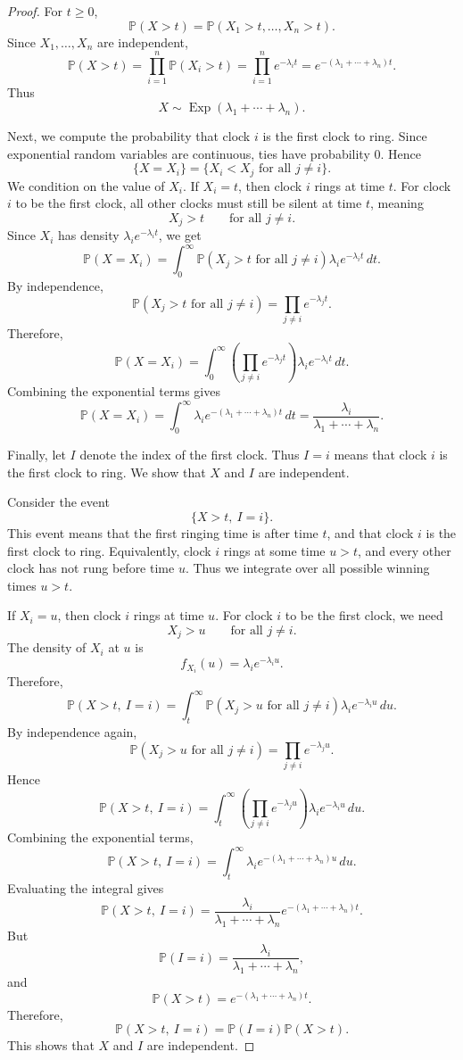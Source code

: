 \documentclass[11pt]{article}
\theoremstyle{plain}
\theoremstyle{definition}
\theoremstyle{remark}
\begin{document}
\begin{proof}
	For \(t\ge 0\),
	\[
	\mathbb{P}(X>t)
	=
	\mathbb{P}(X_1>t,\dots,X_n>t).
	\]
	Since \(X_1,\dots,X_n\) are independent,
	\[
	\mathbb{P}(X>t)
	=
	\prod_{i=1}^{n}\mathbb{P}(X_i>t)
	=
	\prod_{i=1}^{n}e^{-\lambda_i t}
	=
	e^{-(\lambda_1+\cdots+\lambda_n)t}.
	\]
	Thus
	\[
	X\sim\operatorname{Exp}(\lambda_1+\cdots+\lambda_n).
	\]
	
	Next, we compute the probability that clock \(i\) is the first clock to ring. Since exponential random variables are continuous, ties have probability \(0\). Hence
	\[
	\{X=X_i\}
	=
	\{X_i<X_j\text{ for all }j\neq i\}.
	\]
	We condition on the value of \(X_i\). If \(X_i=t\), then clock \(i\) rings at time \(t\). For clock \(i\) to be the first clock, all other clocks must still be silent at time \(t\), meaning
	\[
	X_j>t
	\qquad
	\text{for all }j\neq i.
	\]
	Since \(X_i\) has density \(\lambda_i e^{-\lambda_i t}\), we get
	\[
	\mathbb{P}(X=X_i)
	=
	\int_0^\infty
	\mathbb{P}(X_j>t\text{ for all }j\neq i)\lambda_i e^{-\lambda_i t}\,dt.
	\]
	By independence,
	\[
	\mathbb{P}(X_j>t\text{ for all }j\neq i)
	=
	\prod_{j\neq i}e^{-\lambda_j t}.
	\]
	Therefore,
	\[
	\mathbb{P}(X=X_i)
	=
	\int_0^\infty
	\left(\prod_{j\neq i}e^{-\lambda_j t}\right)
	\lambda_i e^{-\lambda_i t}\,dt.
	\]
	Combining the exponential terms gives
	\[
	\mathbb{P}(X=X_i)
	=
	\int_0^\infty
	\lambda_i e^{-(\lambda_1+\cdots+\lambda_n)t}\,dt
	=
	\frac{\lambda_i}{\lambda_1+\cdots+\lambda_n}.
	\]
	
	Finally, let \(I\) denote the index of the first clock. Thus \(I=i\) means that clock \(i\) is the first clock to ring. We show that \(X\) and \(I\) are independent.
	
	Consider the event
	\[
	\{X>t,\ I=i\}.
	\]
	This event means that the first ringing time is after time \(t\), and that clock \(i\) is the first clock to ring. Equivalently, clock \(i\) rings at some time \(u>t\), and every other clock has not rung before time \(u\). Thus we integrate over all possible winning times \(u>t\).
	
	If \(X_i=u\), then clock \(i\) rings at time \(u\). For clock \(i\) to be the first clock, we need
	\[
	X_j>u
	\qquad
	\text{for all }j\neq i.
	\]
	The density of \(X_i\) at \(u\) is
	\[
	f_{X_i}(u)=\lambda_i e^{-\lambda_i u}.
	\]
	Therefore,
	\[
	\mathbb{P}(X>t,\ I=i)
	=
	\int_t^\infty
	\mathbb{P}(X_j>u\text{ for all }j\neq i)
	\lambda_i e^{-\lambda_i u}\,du.
	\]
	By independence again,
	\[
	\mathbb{P}(X_j>u\text{ for all }j\neq i)
	=
	\prod_{j\neq i}e^{-\lambda_j u}.
	\]
	Hence
	\[
	\mathbb{P}(X>t,\ I=i)
	=
	\int_t^\infty
	\left(\prod_{j\neq i}e^{-\lambda_j u}\right)
	\lambda_i e^{-\lambda_i u}\,du.
	\]
	Combining the exponential terms,
	\[
	\mathbb{P}(X>t,\ I=i)
	=
	\int_t^\infty
	\lambda_i e^{-(\lambda_1+\cdots+\lambda_n)u}\,du.
	\]
	Evaluating the integral gives
	\[
	\mathbb{P}(X>t,\ I=i)
	=
	\frac{\lambda_i}{\lambda_1+\cdots+\lambda_n}
	e^{-(\lambda_1+\cdots+\lambda_n)t}.
	\]
	But
	\[
	\mathbb{P}(I=i)
	=
	\frac{\lambda_i}{\lambda_1+\cdots+\lambda_n},
	\]
	and
	\[
	\mathbb{P}(X>t)
	=
	e^{-(\lambda_1+\cdots+\lambda_n)t}.
	\]
	Therefore,
	\[
	\mathbb{P}(X>t,\ I=i)
	=
	\mathbb{P}(I=i)\mathbb{P}(X>t).
	\]
	This shows that \(X\) and \(I\) are independent.
\end{proof}
\end{document}
